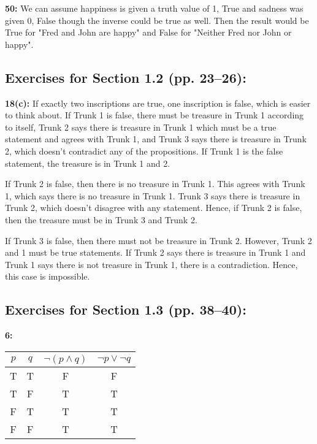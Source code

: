 \documentclass[12pt]{article}  %
\newcommand{\NOT}{\neg}
\newcommand{\AND}{\wedge}
\newcommand{\OR}{\vee}
\begin{document}
\noindent
{\bf 50:}
We can assume happiness is given a truth value of 1, True and sadness was given 0, False though the inverse could be true as well. Then the result would be True for "Fred and John are happy" and False for "Neither Fred nor John or happy".



\subsection*{Exercises for Section 1.2 (pp. 23--26):}     

\noindent
{\bf 18(c):} If exactly two inscriptions are true, one inscription is false, which is easier to think about. If Trunk 1 is false, there must be treasure in Trunk 1 according to itself, Trunk 2 says there is treasure in Trunk 1 which must be a true statement and agrees with Trunk 1, and Trunk 3 says there is treasure in Trunk 2, which doesn't contradict any of the propositions. If Trunk 1 is the false statement, the treasure is in Trunk 1 and 2. 

If Trunk 2 is false, then there is no treasure in Trunk 1. This agrees with Trunk 1, which says there is no treasure in Trunk 1. Trunk 3 says there is treasure in Trunk 2, which doesn't disagree with any statement. Hence, if Trunk 2 is false, then the treasure must be in Trunk 3 and Trunk 2.

If Trunk 3 is false, then there must not be treasure in Trunk 2. However, Trunk 2 and 1 must be true statements. If Trunk 2 says there is treasure in Trunk 1 and Trunk 1 says there is not treasure in Trunk 1, there is a contradiction. Hence, this case is impossible.


\subsection*{Exercises for Section 1.3 (pp. 38--40):}     

\noindent
{\bf 6:}\\

\begin{tabular}{|c|c|c|c|}  %
\hline                  %
$p$ & $q$ & $\NOT (p \AND q)$ & $\NOT p \OR \NOT q$ \\       %
\hline
\hline
T & T & F & F\\
\hline
T & F & T & T\\
\hline
F & T & T & T\\
\hline
F & F & T & T\\
\hline
\end{tabular}
\end{document}
